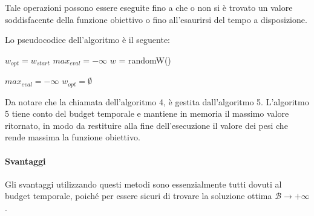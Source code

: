 Tale operazioni possono essere eseguite fino a che o non si è trovato un valore
soddisfacente della funzione obiettivo o fino all'esaurirsi del tempo a disposizione.

\pagebreak

Lo pseudocodice dell'algoritmo è il seguente:
\begin{algorithm}[h!]
	\small
	\DontPrintSemicolon
	\BlankLine

	$w_{opt} = w_{start}$\;
	$max_{eval} = -\infty$\;
	$w$ = randomW()\;
		
	\BlankLine
	
	
	\caption{\textsc{}}
	\label{alg:lsrs}
\end{algorithm}



\begin{algorithm}[h!]
	\small
	\DontPrintSemicolon
	\BlankLine
	
	$max_{eval} = -\infty$\;
	$w_{opt} = \emptyset $\;
	
	\caption{\textsc{}}
	\label{alg:lsrsm}
\end{algorithm}

Da notare che la chiamata dell'algoritmo 4, è gestita
dall'algoritmo 5. L'algoritmo 5 tiene conto del budget temporale e mantiene in memoria
il massimo valore ritornato, in modo da restituire alla fine dell'esecuzione
il valore dei pesi che rende massima la funzione obiettivo.

\paragraph{Svantaggi}
Gli svantaggi utilizzando questi metodi sono essenzialmente tutti dovuti al budget temporale,
poiché per essere sicuri di trovare la soluzione ottima $\mathcal{B} \to +\infty$.


